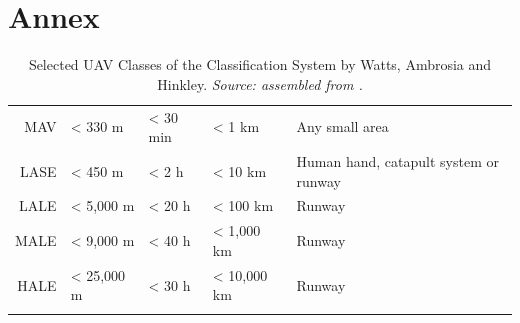 \chapter{Annex}

\begin{table}[H]
    \caption[Selected UAV Classes of the Classification System by Watts, Ambrosia and Hinkley]{Selected UAV Classes of the Classification System by Watts, Ambrosia and Hinkley. \textit{Source: assembled from \cite{Watts2012}.}}
    \label{tab:UAV_classification_system_by_Watts_Ambrosia_and_Hinkley}
    \centering
    \begin{tabular}{r l l l L{0.3\textwidth}}
    \toprule
     &  &  &  &  \\
    \midrule
    MAV     & < 330 m       & < 30 min  & < 1 km        & Any small area \\
    LASE    & < 450 m       & < 2 h     & < 10 km       & Human hand, catapult system or runway \\
    LALE    & < 5,000 m     & < 20 h    & < 100 km      & Runway \\
    MALE    & < 9,000 m     & < 40 h    & < 1,000 km    & Runway \\
    HALE    & < 25,000 m    & < 30 h    & < 10,000 km   & Runway \\
    \bottomrule\\
    \end{tabular}
\end{table}

%



